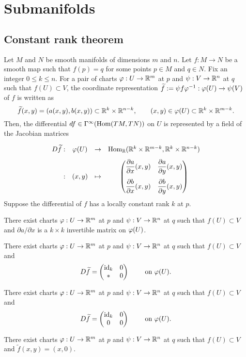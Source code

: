 \documentclass{../../large}
\begin{document}
\chapter{Submanifolds}


\section{Constant rank theorem}

\begin{prb}
Let $M$ and $N$ be smooth manifolds of dimensions $m$ and $n$.
Let $f:M\to N$ be a smooth map such that $f(p)=q$ for some points $p\in M$ and $q\in N$.
Fix an integer $0\le k\le n$.
For a pair of charts $\varphi:U\to\mathbb{R}^m$ at $p$ and $\psi:V\to\mathbb{R}^n$ at $q$ such that $f(U)\subset V$, the coordinate representation $\widetilde f:=\psi f\varphi^{-1}:\varphi(U)\to\psi(V)$ of $f$ is written as
\[\widetilde f(x,y)=(a(x,y),b(x,y))\subset\mathbb{R}^k\times\mathbb{R}^{n-k},\qquad(x,y)\in\varphi(U)\subset\mathbb{R}^k\times\mathbb{R}^{m-k}.\]
Then, the differential $df\in\Gamma^\infty(\operatorname{Hom}(TM,TN))$ on $U$ is represented by a field of the Jacobian matrices


\[\begin{array}{rccc}
D\widetilde f:&\varphi(U)&\to&\operatorname{Hom}_{\mathbb{R}}(\mathbb{R}^k\times\mathbb{R}^{m-k},\mathbb{R}^k\times\mathbb{R}^{n-k})\\[8pt]
:&(x,y)&\mapsto&\begin{pmatrix}\dfrac{\partial a}{\partial x}(x,y)&\dfrac{\partial a}{\partial y}(x,y)\\[12pt]\dfrac{\partial b}{\partial x}(x,y)&\dfrac{\partial b}{\partial y}(x,y)\end{pmatrix}
\end{array}\]
Suppose the differential of $f$ has a locally constant rank $k$ at $p$.
\begin{parts}
\item There exist charts $\varphi:U\to\mathbb{R}^m$ at $p$ and $\psi:V\to\mathbb{R}^n$ at $q$ such that $f(U)\subset V$ and $\partial a/\partial x$ is a $k\times k$ invertible matrix on $\varphi(U)$.
\item There exist charts $\varphi:U\to\mathbb{R}^m$ at $p$ and $\psi:V\to\mathbb{R}^n$ at $q$ such that $f(U)\subset V$ and
\[D\widetilde f=\begin{pmatrix}\operatorname{id}_k&0\\\ast&0\end{pmatrix}\qquad\text{ on }\varphi(U).\]
\item There exist charts $\varphi:U\to\mathbb{R}^m$ at $p$ and $\psi:V\to\mathbb{R}^n$ at $q$ such that $f(U)\subset V$ and
\[D\widetilde f=\begin{pmatrix}\operatorname{id}_k&0\\0&0\end{pmatrix}\qquad\text{ on }\varphi(U).\]
\item There exist charts $\varphi:U\to\mathbb{R}^m$ at $p$ and $\psi:V\to\mathbb{R}^n$ at $q$ such that $f(U)\subset V$ and $\tilde f(x,y)=(x,0)$.
\end{parts}
\end{prb}
\end{document}
